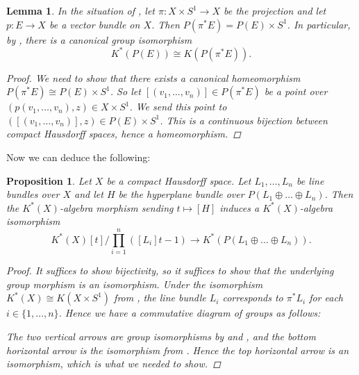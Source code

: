 \documentclass[12pt,a4paper]{amsart}
\theoremstyle{plain}
\newtheorem{lm}[thm]{Lemma}
\newtheorem{prop}[thm]{Proposition}
\theoremstyle{definition}
\theoremstyle{remark}
\begin{document}
\begin{lm}\label{lm:gradedvsoldbundle}
  In the situation of , let $\pi \colon X \times S^{1} \to X$ be the projection and let $p \colon E \to X$ be a vector bundle on $X$.
  Then $P(\pi^{*}E) = P(E) \times S^{1}$.
  In particular, by , there is a canonical group isomorphism
  \[ K^{*}(P(E)) \cong K(P(\pi^{*}E)). \]
  \begin{proof}
    We need to show that there exists a canonical homeomorphism $P(\pi^{*}E) \cong P(E) \times S^{1}$.
    So let $[(v_{1}, \ldots, v_{n})] \in P(\pi^{*}E)$ be a point over $(p(v_{1}, \ldots, v_{n}), z) \in X \times S^{1}$.
    We send this point to $([(v_{1}, \ldots, v_{n})], z) \in P(E) \times S^{1}$.
    This is a continuous bijection between compact Hausdorff spaces, hence a homeomorphism.
  \end{proof}
\end{lm}

Now we can deduce the following:

\begin{prop}\label{prop:sumgraded}
  Let $X$ be a compact Hausdorff space.
  Let $L_{1}, \ldots, L_{n}$ be line bundles over $X$ and let $H$ be the hyperplane bundle over $P(L_{1} \oplus \ldots \oplus L_{n})$.
  Then the $K^{*}(X)$-algebra morphism sending $t \mapsto [H]$ induces a $K^{*}(X)$-algebra isomorphism
  \[ K^{*}(X)[t]/\prod_{i=1}^{n}([L_{i}]t - 1) \to K^{*}(P(L_{1} \oplus \ldots \oplus L_{n})). \]
  \begin{proof}
    It suffices to show bijectivity, so it suffices to show that the underlying group morphism is an isomorphism.
    Under the isomorphism $K^{*}(X) \cong K(X \times S^{1})$ from , the line bundle $L_{i}$ corresponds to $\pi^{*}L_{i}$ for each $i \in \{1, \ldots, n\}$.
    Hence we have a commutative diagram of groups as follows:
    
    \begin{center}
    \end{center}
    
    The two vertical arrows are group isomorphisms by  and , and the bottom horizontal arrow is the isomorphism from .
    Hence the top horizontal arrow is an isomorphism, which is what we needed to show.
  \end{proof}
\end{prop}
\end{document}

